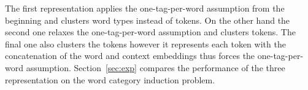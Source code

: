 The first representation applies the one-tag-per-word assumption from
the beginning and clusters word types instead of tokens.  On the other
hand the second one relaxes the one-tag-per-word assumption and
clusters tokens.  The final one also clusters the tokens however it
represents each token with the concatenation of the word and context
embeddings thus forces the one-tag-per-word assumption.
Section~\ref{sec:exp} compares the performance of the three
representation on the word category induction problem.

